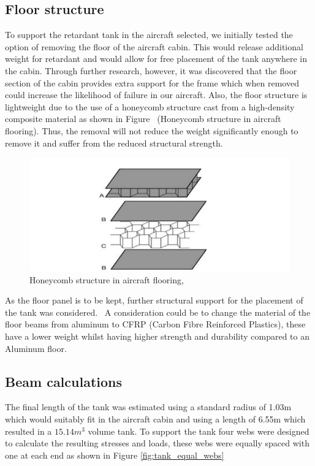 \subsection{Floor structure}

To support the retardant tank in the aircraft selected, we initially tested the option of removing the floor of the aircraft cabin. This would release additional weight for retardant and would allow for free placement of the tank anywhere in the cabin. Through further research, however, it was discovered that the floor section of the cabin provides extra support for the frame which when removed could increase the likelihood of failure in our aircraft. Also, the floor structure is lightweight due to the use of a honeycomb structure cast from a high-density composite material as shown in Figure  (Honeycomb structure in aircraft flooring). Thus, the removal will not reduce the weight significantly enough to remove it and suffer from the reduced structural strength. 

\begin{figure}[!htbp]
\centering
\includegraphics[width= \linewidth]{../figures/honeycomb_structure_in_aircraft_flooring.jpg}
  \caption{Honeycomb structure in aircraft flooring, \cite{ganesh2015design}}
\label{fig:honeycomb_structure_in_aircraft_flooring}
\end{figure}
\FloatBarrier

As the floor panel is to be kept, further structural support for the placement of the tank was considered.  A consideration could be to change the material of the floor beams from aluminum to CFRP (Carbon Fibre Reinforced Plastics), these have a lower weight whilst having higher strength and durability compared to an Aluminum floor. 

\subsection{Beam calculations}
The final length of the tank was estimated using a standard radius of 1.03m which would suitably fit in the aircraft cabin and using a length of 6.55m which resulted in a $15.14 m^3$ volume tank. To support the tank four webs were designed to calculate the resulting stresses and loads, these webs were equally spaced with one at each end as shown in Figure \ref{fig:tank_equal_webs}


